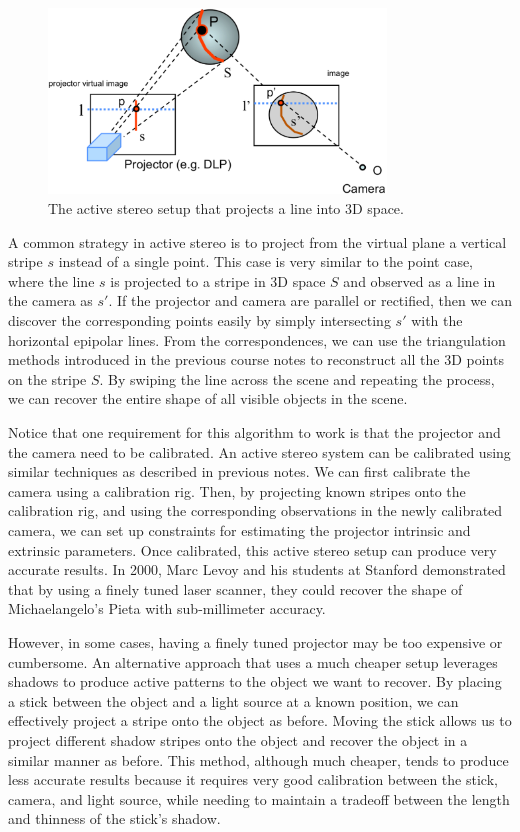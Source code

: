 \documentclass[a4paper, 12pt]{article}
\numberwithin{equation}{section}
\begin{document}
\begin{figure}[h!]
    \centering
    \includegraphics[width = 0.8\textwidth]{figures/active_stereo_line.png}
    \caption{The active stereo setup that projects a line into 3D space.}
    \label{fig:active_stereo_line}
\end{figure}

A common strategy in active stereo is to project from the virtual plane a vertical stripe $s$ instead of a single point. This case is very similar to the point case, where the line $s$ is projected to a stripe in 3D space $S$ and observed as a line in the camera as $s'$. If the projector and camera are parallel or rectified, then we can discover the corresponding points easily by simply intersecting $s'$ with the horizontal epipolar lines. From the correspondences, we can use the triangulation methods introduced in the previous course notes to reconstruct all the 3D points on the stripe $S$. By swiping the line across the scene and repeating the process, we can recover the entire shape of all visible objects in the scene. 

Notice that one requirement for this algorithm to work is that the projector and the camera need to be calibrated. An active stereo system can be calibrated using similar techniques as described in previous notes. We can first calibrate the camera using a calibration rig. Then, by projecting known stripes onto the calibration rig, and using the corresponding observations in the newly calibrated camera, we can set up constraints for estimating the projector intrinsic and extrinsic parameters. Once calibrated, this active stereo setup can produce very accurate results. In 2000, Marc Levoy and his students at Stanford demonstrated that by using a finely tuned laser scanner, they could recover the shape of Michaelangelo's Pieta with sub-millimeter accuracy.

However, in some cases, having a finely tuned projector may be too expensive or cumbersome. An alternative approach that uses a much cheaper setup leverages shadows to produce active patterns to the object we want to recover. By placing a stick between the object and a light source at a known position, we can effectively project a stripe onto the object as before. Moving the stick allows us to project different shadow stripes onto the object and recover the object in a similar manner as before. This method, although much cheaper, tends to produce less accurate results because it requires very good calibration between the stick, camera, and light source, while needing to maintain a tradeoff between the length and thinness of the stick's shadow.
\end{document}
